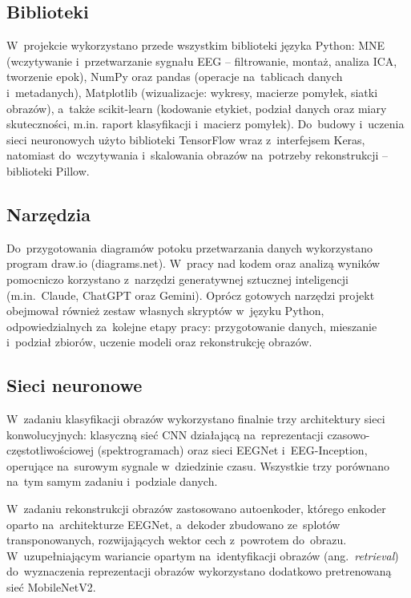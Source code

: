 \documentclass[12pt,a4paper,numbers=enddot,headings=small]{scrartcl} %
\begin{document}
	\subsection{Biblioteki}
	
	W~projekcie wykorzystano przede wszystkim biblioteki języka Python: MNE
	(wczytywanie i~przetwarzanie sygnału EEG -- filtrowanie, montaż, analiza ICA,
	tworzenie epok), NumPy oraz pandas (operacje na~tablicach danych i~metadanych),
	Matplotlib (wizualizacje: wykresy, macierze pomyłek, siatki obrazów), a~także
	scikit-learn (kodowanie etykiet, podział danych oraz miary skuteczności, m.in.
	raport klasyfikacji i~macierz pomyłek). Do~budowy i~uczenia sieci neuronowych
	użyto biblioteki TensorFlow wraz z~interfejsem Keras, natomiast do~wczytywania
	i~skalowania obrazów na~potrzeby rekonstrukcji -- biblioteki Pillow.
	
	\subsection{Narzędzia}
	
	Do~przygotowania diagramów potoku przetwarzania danych wykorzystano program
	draw.io (diagrams.net). W~pracy nad kodem oraz analizą wyników pomocniczo
	korzystano z~narzędzi generatywnej sztucznej inteligencji (m.in.~Claude,
	ChatGPT oraz Gemini). Oprócz gotowych narzędzi projekt obejmował również zestaw
	własnych skryptów w~języku Python, odpowiedzialnych za~kolejne etapy pracy:
	przygotowanie danych, mieszanie i~podział zbiorów, uczenie modeli oraz
	rekonstrukcję obrazów.
	
	\subsection{Sieci neuronowe}
	
	W~zadaniu klasyfikacji obrazów wykorzystano finalnie trzy architektury sieci
	konwolucyjnych: klasyczną sieć CNN działającą na~reprezentacji
	czasowo-częstotliwościowej (spektrogramach) oraz sieci EEGNet i~EEG-Inception,
	operujące na~surowym sygnale w~dziedzinie czasu. Wszystkie trzy porównano na~tym
	samym zadaniu i~podziale danych.
	
	W~zadaniu rekonstrukcji obrazów zastosowano autoenkoder, którego enkoder oparto
	na~architekturze EEGNet, a~dekoder zbudowano ze~splotów transponowanych,
	rozwijających wektor cech z~powrotem do~obrazu. W~uzupełniającym wariancie
	opartym na~identyfikacji obrazów (ang.~\textit{retrieval}) do~wyznaczenia
	reprezentacji obrazów wykorzystano dodatkowo pretrenowaną sieć MobileNetV2.
	
\end{document}
